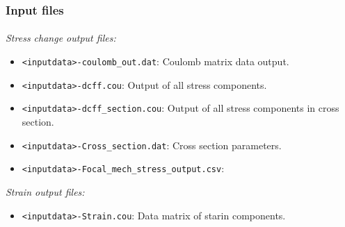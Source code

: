 \begin{frame}[t,fragile]
  \frametitle{Input files}
  \framesubtitle{}
  \label{fr2:satgeod3}
\emph{Stress change output files:}

\begin{itemize}
\item
  \texttt{\textless{}inputdata\textgreater{}-coulomb\_out.dat}: Coulomb
  matrix data output.
\item
  \texttt{\textless{}inputdata\textgreater{}-dcff.cou}: Output of all
  stress components.
\item
  \texttt{\textless{}inputdata\textgreater{}-dcff\_section.cou}: Output
  of all stress components in cross section.
\item
  \texttt{\textless{}inputdata\textgreater{}-Cross\_section.dat}: Cross
  section parameters.
\item
  \texttt{\textless{}inputdata\textgreater{}-Focal\_mech\_stress\_output.csv}:
\end{itemize}

\emph{Strain output files:}

\begin{itemize}

\item
  \texttt{\textless{}inputdata\textgreater{}-Strain.cou}: Data matrix of
  starin components.
\end{itemize}
\end{frame}
\note{} %


